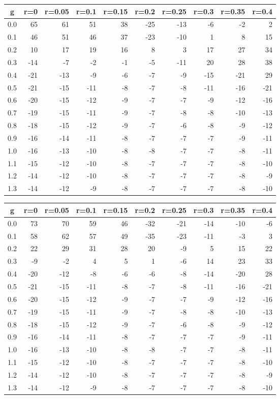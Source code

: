 %
\begin{table}[!tbp]
 \begin{center}
 \begin{tabular}{rrrrrrrrrr}\hline\hline
\multicolumn{1}{c}{g}&\multicolumn{1}{c}{r=0}&\multicolumn{1}{c}{r=0.05}&\multicolumn{1}{c}{r=0.1}&\multicolumn{1}{c}{r=0.15}&\multicolumn{1}{c}{r=0.2}&\multicolumn{1}{c}{r=0.25}&\multicolumn{1}{c}{r=0.3}&\multicolumn{1}{c}{r=0.35}&\multicolumn{1}{c}{r=0.4}\tabularnewline
\hline
0.0& 65& 61& 51&38&-25&-13& -6& -2&  2\tabularnewline
0.1& 46& 51& 46&37&-23&-10&  1&  8& 15\tabularnewline
0.2& 10& 17& 19&16&  8&  3& 17& 27& 34\tabularnewline
0.3&-14& -7& -2&-1& -5&-11& 20& 28& 38\tabularnewline
0.4&-21&-13& -9&-6& -7& -9&-15&-21& 29\tabularnewline
0.5&-21&-15&-11&-8& -7& -8&-11&-16&-21\tabularnewline
0.6&-20&-15&-12&-9& -7& -7& -9&-12&-16\tabularnewline
0.7&-19&-15&-11&-9& -7& -8& -8&-10&-13\tabularnewline
0.8&-18&-15&-12&-9& -7& -6& -8& -9&-12\tabularnewline
0.9&-16&-14&-11&-8& -7& -7& -7& -9&-11\tabularnewline
1.0&-16&-13&-10&-8& -8& -7& -7& -8&-11\tabularnewline
1.1&-15&-12&-10&-8& -7& -7& -7& -8&-10\tabularnewline
1.2&-14&-12&-10&-8& -7& -7& -7& -8& -9\tabularnewline
1.3&-14&-12& -9&-8& -7& -7& -7& -8&-10\tabularnewline
\hline
\end{tabular}

\end{center}

\end{table}

%
\begin{table}[!tbp]
 \begin{center}
 \begin{tabular}{rrrrrrrrrr}\hline\hline
\multicolumn{1}{c}{g}&\multicolumn{1}{c}{r=0}&\multicolumn{1}{c}{r=0.05}&\multicolumn{1}{c}{r=0.1}&\multicolumn{1}{c}{r=0.15}&\multicolumn{1}{c}{r=0.2}&\multicolumn{1}{c}{r=0.25}&\multicolumn{1}{c}{r=0.3}&\multicolumn{1}{c}{r=0.35}&\multicolumn{1}{c}{r=0.4}\tabularnewline
\hline
0.0& 73& 70& 59&46&-32&-21&-14&-10& -6\tabularnewline
0.1& 58& 62& 57&49&-35&-23&-11& -3&  3\tabularnewline
0.2& 22& 29& 31&28& 20& -9&  5& 15& 22\tabularnewline
0.3& -9& -2&  4& 5&  1& -6& 14& 23& 33\tabularnewline
0.4&-20&-12& -8&-6& -6& -8&-14&-20& 28\tabularnewline
0.5&-21&-15&-11&-8& -7& -8&-11&-16&-21\tabularnewline
0.6&-20&-15&-12&-9& -7& -7& -9&-12&-16\tabularnewline
0.7&-19&-15&-11&-9& -7& -8& -8&-10&-13\tabularnewline
0.8&-18&-15&-12&-9& -7& -6& -8& -9&-12\tabularnewline
0.9&-16&-14&-11&-8& -7& -7& -7& -9&-11\tabularnewline
1.0&-16&-13&-10&-8& -8& -7& -7& -8&-11\tabularnewline
1.1&-15&-12&-10&-8& -7& -7& -7& -8&-10\tabularnewline
1.2&-14&-12&-10&-8& -7& -7& -7& -8& -9\tabularnewline
1.3&-14&-12& -9&-8& -7& -7& -7& -8&-10\tabularnewline
\hline
\end{tabular}

\end{center}

\end{table}

